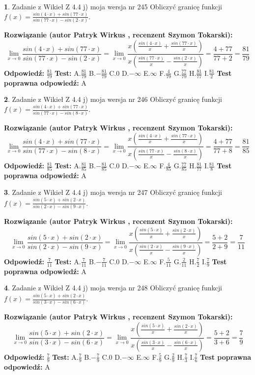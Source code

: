 \documentclass[12pt, a4paper]{article}
\theoremstyle{definition} %
\newtheorem{zad}{}
\newcommand{\zadStart}[1]{\begin{zad}#1\newline}
\newcommand{\zadStop}{\end{zad}}
\newcommand{\rozwStart}[2]{\noindent \textbf{Rozwiązanie (autor #1 , recenzent #2): }\newline}
\newcommand{\rozwStop}{\newline}
\newcommand{\odpStart}{\noindent \textbf{Odpowiedź:}\newline}
\newcommand{\odpStop}{\newline}
\newcommand{\testStart}{\noindent \textbf{Test:}\newline}
\newcommand{\testStop}{\newline}
\newcommand{\kluczStart}{\noindent \textbf{Test poprawna odpowiedź:}\newline}
\newcommand{\kluczStop}{\newline}
\begin{document}
\zadStart{Zadanie z Wikieł Z 4.4 j) moja wersja nr 245}
Obliczyć granicę funkcji $f(x)=\frac{sin(4\cdot x) +sin(77\cdot x)}{sin(77\cdot x) -sin(2\cdot x)}$.
\zadStop
\rozwStart{Patryk Wirkus}{Szymon Tokarski}
$$\lim\limits_{x\to 0}\frac{sin(4\cdot x) +sin(77\cdot x)}{sin(77\cdot x) -sin(2\cdot x)}=\lim\limits_{x\to 0}\frac{x(\frac{sin(4\cdot x)}{x}+\frac{sin(77\cdot x)}{x})}{x(\frac{sin(77\cdot x)}{x}-\frac{sin(2\cdot x)}{x})}=\frac{4+77}{77+2} = \frac{81}{79}$$
\rozwStop
\odpStart
$\frac{81}{79}$
\odpStop
\testStart
A.$\frac{81}{79}$
B.$-\frac{81}{79}$
C.$0$
D.$-\infty$
E.$\infty$
F.$\frac{4}{79}$
G.$\frac{77}{79}$
H.$\frac{81}{77}$
I.$\frac{81}{2}$
\testStop
\kluczStart
A
\kluczStop



\zadStart{Zadanie z Wikieł Z 4.4 j) moja wersja nr 246}
Obliczyć granicę funkcji $f(x)=\frac{sin(4\cdot x) +sin(77\cdot x)}{sin(77\cdot x) -sin(8\cdot x)}$.
\zadStop
\rozwStart{Patryk Wirkus}{Szymon Tokarski}
$$\lim\limits_{x\to 0}\frac{sin(4\cdot x) +sin(77\cdot x)}{sin(77\cdot x) -sin(8\cdot x)}=\lim\limits_{x\to 0}\frac{x(\frac{sin(4\cdot x)}{x}+\frac{sin(77\cdot x)}{x})}{x(\frac{sin(77\cdot x)}{x}-\frac{sin(8\cdot x)}{x})}=\frac{4+77}{77+8} = \frac{81}{85}$$
\rozwStop
\odpStart
$\frac{81}{85}$
\odpStop
\testStart
A.$\frac{81}{85}$
B.$-\frac{81}{85}$
C.$0$
D.$-\infty$
E.$\infty$
F.$\frac{4}{85}$
G.$\frac{77}{85}$
H.$\frac{81}{77}$
I.$\frac{81}{8}$
\testStop
\kluczStart
A
\kluczStop



\zadStart{Zadanie z Wikieł Z 4.4 j) moja wersja nr 247}
Obliczyć granicę funkcji $f(x)=\frac{sin(5\cdot x) +sin(2\cdot x)}{sin(2\cdot x) -sin(9\cdot x)}$.
\zadStop
\rozwStart{Patryk Wirkus}{Szymon Tokarski}
$$\lim\limits_{x\to 0}\frac{sin(5\cdot x) +sin(2\cdot x)}{sin(2\cdot x) -sin(9\cdot x)}=\lim\limits_{x\to 0}\frac{x(\frac{sin(5\cdot x)}{x}+\frac{sin(2\cdot x)}{x})}{x(\frac{sin(2\cdot x)}{x}-\frac{sin(9\cdot x)}{x})}=\frac{5+2}{2+9} = \frac{7}{11}$$
\rozwStop
\odpStart
$\frac{7}{11}$
\odpStop
\testStart
A.$\frac{7}{11}$
B.$-\frac{7}{11}$
C.$0$
D.$-\infty$
E.$\infty$
F.$\frac{5}{11}$
G.$\frac{2}{11}$
H.$\frac{7}{2}$
I.$\frac{7}{9}$
\testStop
\kluczStart
A
\kluczStop



\zadStart{Zadanie z Wikieł Z 4.4 j) moja wersja nr 248}
Obliczyć granicę funkcji $f(x)=\frac{sin(5\cdot x) +sin(2\cdot x)}{sin(3\cdot x) -sin(6\cdot x)}$.
\zadStop
\rozwStart{Patryk Wirkus}{Szymon Tokarski}
$$\lim\limits_{x\to 0}\frac{sin(5\cdot x) +sin(2\cdot x)}{sin(3\cdot x) -sin(6\cdot x)}=\lim\limits_{x\to 0}\frac{x(\frac{sin(5\cdot x)}{x}+\frac{sin(2\cdot x)}{x})}{x(\frac{sin(3\cdot x)}{x}-\frac{sin(6\cdot x)}{x})}=\frac{5+2}{3+6} = \frac{7}{9}$$
\rozwStop
\odpStart
$\frac{7}{9}$
\odpStop
\testStart
A.$\frac{7}{9}$
B.$-\frac{7}{9}$
C.$0$
D.$-\infty$
E.$\infty$
F.$\frac{5}{9}$
G.$\frac{2}{9}$
H.$\frac{7}{3}$
I.$\frac{7}{6}$
\testStop
\kluczStart
A
\kluczStop
\end{document}
